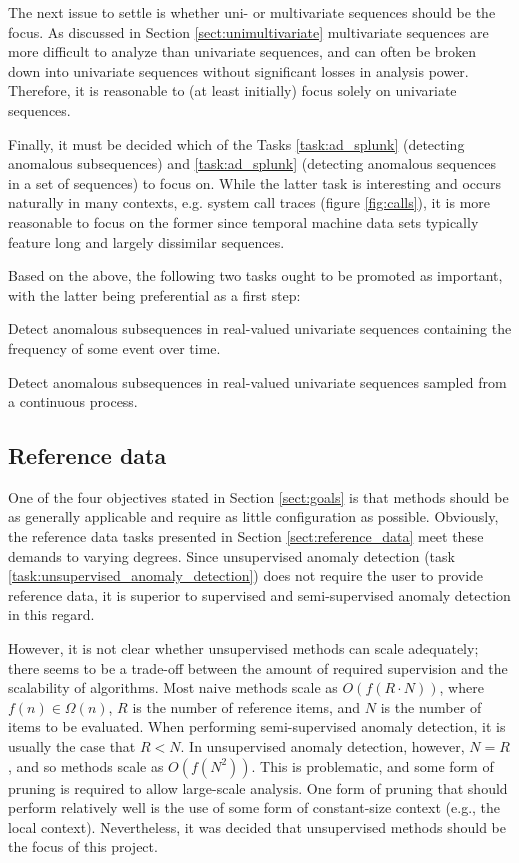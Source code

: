 The next issue to settle is whether uni- or multivariate sequences should be the focus. As discussed in Section \ref{sect:unimultivariate} multivariate sequences are more difficult to analyze than univariate sequences, and can often be broken down into univariate sequences without significant losses in analysis power. Therefore, it is reasonable to (at least initially) focus solely on univariate sequences.

Finally, it must be decided which of the Tasks \ref{task:ad_splunk} (detecting anomalous subsequences) and \ref{task:ad_splunk} (detecting anomalous sequences in a set of sequences) to focus on. While the latter task is interesting and occurs naturally in many contexts, e.g. system call traces (figure \ref{fig:calls}), it is more reasonable to focus on the former since temporal machine data sets typically feature long and largely dissimilar sequences.

Based on the above, the following two tasks ought to be promoted as important, with the latter being preferential as a first step:
\begin{task}
  \label{task:frequency}
  Detect anomalous subsequences in real-valued univariate sequences containing the frequency of some event over time.
\end{task}
\begin{task}
  \label{task:continuous}
  Detect anomalous subsequences in real-valued univariate sequences sampled from a continuous process.
\end{task}

\subsection{Reference data}

One of the four objectives stated in Section \ref{sect:goals} is that methods should be as generally applicable and require as little configuration as possible. Obviously, the reference data tasks presented in Section \ref{sect:reference_data} meet these demands to varying degrees. Since unsupervised anomaly detection (task \ref{task:unsupervised_anomaly_detection}) does not require the user to provide reference data, it is superior to supervised and semi-supervised anomaly detection in this regard.

However, it is not clear whether unsupervised methods can scale adequately; there seems to be a trade-off between the amount of required supervision and the scalability of algorithms. Most naive methods scale as $O(f(R \cdot N))$, where $f(n) \in \Omega(n)$, $R$ is the number of reference items, and $N$ is the number of items to be evaluated. When performing semi-supervised anomaly detection, it is usually the case that $R < N$. In unsupervised anomaly detection, however, $N = R$, and so methods scale as $O(f(N^2))$. This is problematic, and some form of pruning is required to allow large-scale analysis. One form of pruning that should perform relatively well is the use of some form of constant-size context (e.g., the local context). Nevertheless, it was decided that unsupervised methods should be the focus of this project.

